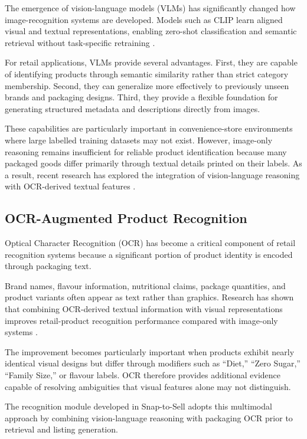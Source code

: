 \documentclass[conference]{IEEEtran}
\begin{document}
The emergence of vision-language models (VLMs) has significantly changed
how image-recognition systems are developed. Models such as CLIP learn
aligned visual and textual representations, enabling zero-shot
classification and semantic retrieval without task-specific retraining
\cite{radford2021clip}.

For retail applications, VLMs provide several advantages. First, they are
capable of identifying products through semantic similarity rather than
strict category membership. Second, they can generalize more effectively to
previously unseen brands and packaging designs. Third, they provide a
flexible foundation for generating structured metadata and descriptions
directly from images.

These capabilities are particularly important in convenience-store
environments where large labelled training datasets may not exist.
However, image-only reasoning remains insufficient for reliable product
identification because many packaged goods differ primarily through textual
details printed on their labels. As a result, recent research has explored
the integration of vision-language reasoning with OCR-derived textual
features \cite{ocrfusion2023}.

\subsection{OCR-Augmented Product Recognition}

Optical Character Recognition (OCR) has become a critical component of
retail recognition systems because a significant portion of product
identity is encoded through packaging text.

Brand names, flavour information, nutritional claims, package quantities,
and product variants often appear as text rather than graphics.
Research has shown that combining OCR-derived textual information with
visual representations improves retail-product recognition performance
compared with image-only systems \cite{ocrfusion2023}.

The improvement becomes particularly important when products exhibit nearly
identical visual designs but differ through modifiers such as ``Diet,''
``Zero Sugar,'' ``Family Size,'' or flavour labels. OCR therefore
provides additional evidence capable of resolving ambiguities that visual
features alone may not distinguish.

The recognition module developed in Snap-to-Sell adopts this multimodal
approach by combining vision-language reasoning with packaging OCR prior
to retrieval and listing generation.
\end{document}
